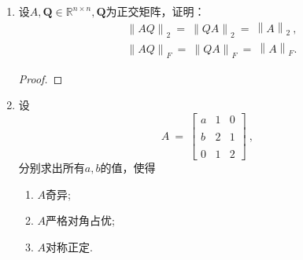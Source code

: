 \documentclass[a4paper]{article}
\begin{document}
\begin{enumerate}
  \item 设$A,\boldsymbol{Q}\in\mathbb{R}^{n\times n},\boldsymbol{Q}$为正交矩阵，证明：
  $$\begin{aligned}&\left\|AQ\right\|_{2}\:=\:\left\|QA\right\|_{2}\:=\:\left\|A\right\|_{2}\:,\\&\left\|AQ\right\|_{F}\:=\:\left\|QA\right\|_{F}\:=\:\left\|A\right\|_{F}.\end{aligned}$$
  \begin{proof}
    
  \end{proof}

  \item 设
  $$A\:=\:\begin{bmatrix}a&1&0\\\\b&2&1\\\\0&1&2\end{bmatrix}\:,$$
  分别求出所有$a,b$的值，使得
  \begin{enumerate}[label=（\arabic*）]
    \item $A$奇异;
    \begin{solution}
      
    \end{solution}
    \item $A$严格对角占优;
    \begin{solution}
      
    \end{solution}
    \item $A$对称正定.
    \begin{solution}
      
    \end{solution}
  \end{enumerate}
\end{enumerate}
\end{document}
